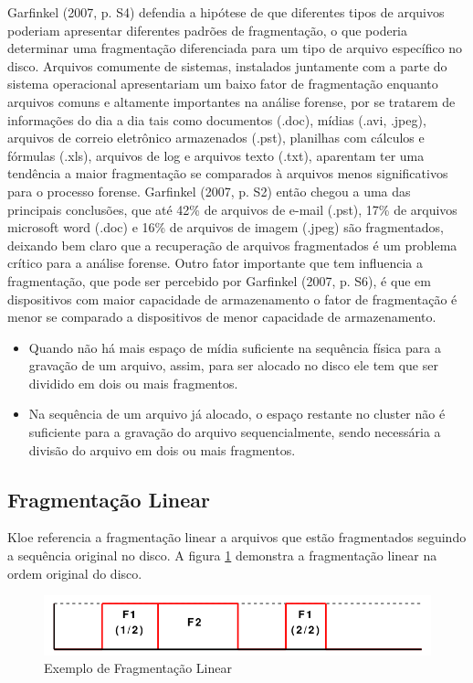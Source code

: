 Garfinkel (2007, p. S4) defendia a hipótese de que diferentes tipos de arquivos poderiam apresentar diferentes padrões de fragmentação, o que poderia determinar uma fragmentação diferenciada para um tipo de arquivo específico no disco. Arquivos comumente de sistemas, instalados juntamente com a parte do sistema operacional apresentariam um baixo fator de fragmentação enquanto arquivos comuns e altamente importantes na análise forense, por se tratarem de informações do dia a dia tais como documentos (.doc), mídias (.avi, .jpeg), arquivos de correio eletrônico armazenados (.pst), planilhas com cálculos e fórmulas (.xls), arquivos de log e arquivos texto (.txt), aparentam ter uma tendência a maior fragmentação se comparados à arquivos menos significativos para o processo forense. Garfinkel (2007, p. S2) então chegou a uma das principais conclusões, que até 42\% de arquivos de e-mail (.pst), 17\% de arquivos microsoft word (.doc) e 16\% de arquivos de imagem (.jpeg) são fragmentados, deixando bem claro que a 
recuperação de arquivos fragmentados é um problema crítico para a análise forense. Outro fator importante que tem influencia a fragmentação, que pode ser percebido por Garfinkel (2007, p. S6), é que em dispositivos com maior capacidade de armazenamento o fator de fragmentação é menor se comparado a dispositivos de menor capacidade de armazenamento.

\begin{itemize}
 \item Quando não há mais espaço de mídia suficiente na sequência física para a gravação de um arquivo, assim, para ser alocado no disco ele tem que ser dividido em dois ou mais fragmentos.
 \item Na sequência de um arquivo já alocado, o espaço restante no cluster não é suficiente para a gravação do arquivo sequencialmente, sendo necessária a divisão do arquivo em dois ou mais fragmentos.
\end{itemize}

\subsection{Fragmentação Linear}
Kloe referencia a fragmentação linear a arquivos que estão fragmentados seguindo a sequência original no disco. A figura \ref{fig:fraglinear} demonstra a fragmentação linear na ordem original do disco.

\begin{figure}[htp]
  \centering
  \includegraphics[scale=0.6]{figuras/fraglinear.png}
  \caption{Exemplo de Fragmentação Linear}
  \label{fig:fraglinear}
\end{figure}

